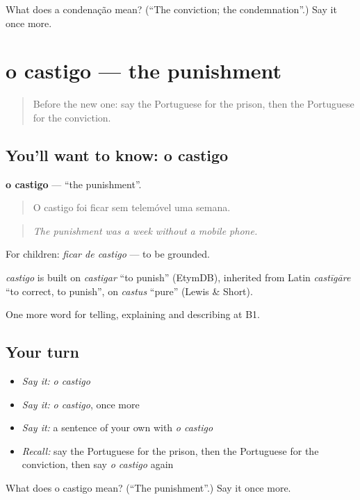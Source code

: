 \begin{tcolorbox}[breakable,colback=teal!4,colframe=teal!35!black,title={Before you move on}]
What does a condenação mean? (\textquotedblleft{}The conviction; the condemnation\textquotedblright{}.) Say it once more.
\end{tcolorbox}
\section[o castigo]{o castigo — the punishment}

\label{lesson:PT-C388-castigo}



\begin{quote}
Before the new one: say the Portuguese for the prison, then the Portuguese for the conviction.
\end{quote}

\subsection*{You'll want to know: o castigo}
\textbf{o castigo} — \textquotedblleft{}the punishment\textquotedblright{}.

\begin{quote}
O castigo foi ficar sem telemóvel uma semana.
\end{quote}

\begin{quote}
\emph{The punishment was a week without a mobile phone.}
\end{quote}

For children: \emph{ficar de castigo} — to be grounded.

\begin{cousinweb}
\emph{castigo} is built on \emph{castigar} \textquotedblleft{}to punish\textquotedblright{} (EtymDB), inherited from Latin \emph{castīgāre} \textquotedblleft{}to correct, to punish\textquotedblright{}, on \emph{castus} \textquotedblleft{}pure\textquotedblright{} (Lewis \& Short).
\end{cousinweb}

\begin{grammarlens}[title={What you've built}]
One more word for telling, explaining and describing at B1.
\end{grammarlens}

\subsection*{Your turn}
\begin{itemize}
\raggedright
  \item \emph{Say it:} \emph{o castigo}
  \item \emph{Say it:} \emph{o castigo}, once more
  \item \emph{Say it:} a sentence of your own with \emph{o castigo}
  \item \emph{Recall:} say the Portuguese for the prison, then the Portuguese for the conviction, then say \emph{o castigo} again
\end{itemize}

\begin{tcolorbox}[breakable,colback=teal!4,colframe=teal!35!black,title={Before you move on}]
What does o castigo mean? (\textquotedblleft{}The punishment\textquotedblright{}.) Say it once more.
\end{tcolorbox}
